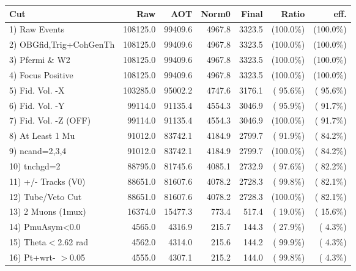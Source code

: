  \begin{table}[h!]\centering
 \begin{tabular}{||l||r|r|r|r|r|r||}
 \hline
 \hline
 Cut & Raw & AOT & Norm0 & Final & Ratio & eff.       \\
 \hline
  1) Raw Events           &     108125.0 &      99409.6 &       4967.8 &       3323.5 & (100.0\%) & (100.0\%) \\
  2) OBGfid,Trig+CohGenTh &     108125.0 &      99409.6 &       4967.8 &       3323.5 & (100.0\%) & (100.0\%) \\
  3) Pfermi \& W2         &     108125.0 &      99409.6 &       4967.8 &       3323.5 & (100.0\%) & (100.0\%) \\
  4) Focus Positive       &     108125.0 &      99409.6 &       4967.8 &       3323.5 & (100.0\%) & (100.0\%) \\
  5) Fid. Vol. -X         &     103285.0 &      95002.2 &       4747.6 &       3176.1 & ( 95.6\%) & ( 95.6\%) \\
  6) Fid. Vol. -Y         &      99114.0 &      91135.4 &       4554.3 &       3046.9 & ( 95.9\%) & ( 91.7\%) \\
  7) Fid. Vol. -Z (OFF)   &      99114.0 &      91135.4 &       4554.3 &       3046.9 & (100.0\%) & ( 91.7\%) \\
  8) At Least 1 Mu        &      91012.0 &      83742.1 &       4184.9 &       2799.7 & ( 91.9\%) & ( 84.2\%) \\
  9) ncand=2,3,4          &      91012.0 &      83742.1 &       4184.9 &       2799.7 & (100.0\%) & ( 84.2\%) \\
 10) tnchgd=2             &      88795.0 &      81745.6 &       4085.1 &       2732.9 & ( 97.6\%) & ( 82.2\%) \\
 11) +/- Tracks (V0)      &      88651.0 &      81607.6 &       4078.2 &       2728.3 & ( 99.8\%) & ( 82.1\%) \\
 12) Tube/Veto Cut        &      88651.0 &      81607.6 &       4078.2 &       2728.3 & (100.0\%) & ( 82.1\%) \\
 13) 2 Muons (1mux)       &      16374.0 &      15477.3 &        773.4 &        517.4 & ( 19.0\%) & ( 15.6\%) \\
 14) PmuAsym<0.0          &       4565.0 &       4316.9 &        215.7 &        144.3 & ( 27.9\%) & (  4.3\%) \\
 15) Theta$<$2.62 rad     &       4562.0 &       4314.0 &        215.6 &        144.2 & ( 99.9\%) & (  4.3\%) \\
 16) Pt+wrt- $>$0.05      &       4555.0 &       4307.1 &        215.2 &        144.0 & ( 99.8\%) & (  4.3\%) \\

\end{tabular}
\end{table}
